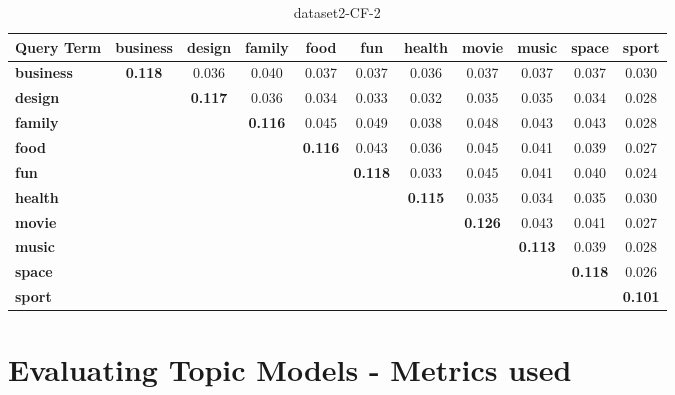 \documentclass{sig-alternate}
\begin{document}
\begin{table}[!ht]
\centering
\resizebox{14cm}{!} 
{
	\begin{tabular}{|l|c|c|c|c|c|c|c|c|c|c|}
	\hline
\textbf{Query Term }& \textbf{business} &\textbf{ design} & \textbf{family} & \textbf{food} &\textbf{ fun} & \textbf{health} & \textbf{movie} & \textbf{music} & \textbf{space} & \textbf{sport}\\
	\hline
\textbf{business}	 & \textbf{0.118	} & 0.036 & 0.040 & 0.037 & 0.037 & 0.036 & 0.037 & 0.037 & 0.037 & 0.030\\ 
	 	\hline
\textbf{design }& 	 	& \textbf{0.117} & 0.036 & 0.034 & 0.033 & 0.032 & 0.035 & 0.035 & 0.034 & 0.028
	 	\\ 
	 	\hline
	 	
\textbf{	 family} &  & 	 & \textbf{0.116} & 0.045 & 0.049 & 0.038 & 0.048 & 0.043 & 0.043 & 0.028 
	 	 \\ 
	 	\hline
\textbf{food} &  &  & 	 	& \textbf{0.116} & 0.043 & 0.036 & 0.045 & 0.041 & 0.039 & 0.027 
	 	\\ 
	 	\hline
\textbf{	fun  }&  &  &  & 	& \textbf{0.118} & 0.033 & 0.045 & 0.041 & 0.040 & 0.024 
	 	\\ 
	 	\hline
\textbf{	 health	} &  &  &  &  & & \textbf{0.115} & 0.035 & 0.034 & 0.035 & 0.030
	 	\\ 
	 	\hline
\textbf{movie	 	} &  &  &  &  &  &  & \textbf{0.126} & 0.043 & 0.041 & 0.027 
	 	 \\ 
	 	\hline
\textbf{music	 }&  &  &  &  &  &  & & \textbf{0.113} & 0.039 & 0.028 
	 	\\ 
	 	\hline
\textbf{	 space	 }&  &  &  &  &  &  &  & & \textbf{0.118} & 0.026 
	 	\\ 
	 	\hline
\textbf{sport	  }&  &  &  &  &  &  &  & & 	& \textbf{0.101}\\
	\hline
	\end{tabular}
}
\caption{dataset2-CF-2}\label{cf6}
\end{table}




 


\section{Evaluating Topic Models - Metrics used}
\end{document}
